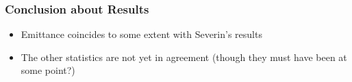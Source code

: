 \documentclass[.08pt,aspectratio=169]{beamer}
\newcommand{\mvec}[1]{\boldsymbol{#1}}
\newcommand{\frametitlepsi}[1]{\frametitle{\hspace{0.8cm}\texttt{[image: logos/PSI.pdf]}\hspace{1.1cm} #1}}
\begin{document}
\begin{frame}
    \frametitle{Conclusion about Results}

\begin{itemize}[label=$\bullet$]
    \item Emittance coincides to some extent with Severin's results
	\item The other statistics are not yet in agreement (though they must have been at some point?)
\end{itemize}

\end{frame}



  
  

  

    
\end{document}
